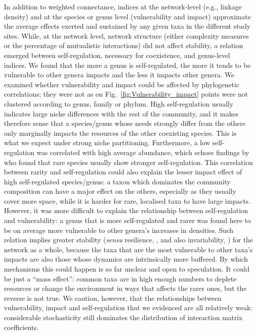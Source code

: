\documentclass[10pt]{article}
\begin{document}
In addition to weighted connectance, indices at the network-level
(e.g., linkage density) and at the species or genus level (vulnerability
and impact) approximate the average effects exerted and sustained
by any given taxa in the different study sites. While, at the network
level, network structure (either complexity measures or the percentage
of mutualistic interactions) did not affect stability, a relation
emerged between self-regulation, necessary for coexistence, and genus-level
indices. We found that the more a genus is self-regulated, the more
it tends to be vulnerable to other genera impacts and the less it
impacts other genera. We examined whether vulnerability and impact
could be affected by phylogenetic correlations; they were not as on
Fig.~\ref{fig:Vulnerability_impact} points were not clustered according
to genus, family or phylum. High self-regulation usually indicates
large niche differences with the rest of the community, and it makes
therefore sense that a species/genus whose needs strongly differ from
the others only marginally impacts the resources of the other coexisting
species. This is what we expect under strong niche partitioning. Furthermore,
a low self-regulation was correlated with high average abundance,
which echoes findings by \citet{yenni_persistent_2017} who found
that rare species usually show stronger self-regulation. This correlation
between rarity and self-regulation could also explain the lesser impact
effect of high self-regulated species/genus: a taxon which dominates
the community composition can have a major effect on the others, especially
as they usually cover more space, while it is harder for rare, localised
taxa to have large impacts. However, it was more difficult to explain
the relationship between self-regulation and vulnerability: a genus
that is more self-regulated and rarer was found here to be on average
more vulnerable to other genera's increases in densities. Such relation
implies greater stability (\emph{sensu} resilience, \citealt{ives_estimating_2003},
and also invariability, \citealt{Arnoldi431296}) for the network
as a whole, because the taxa that are the most vulnerable to other
taxa's impacts are also those whose dynamics are intrinsically more
buffered. By which mechanisms this could happen is so far unclear
and open to speculation. It could be just a ``mass effect'': common
taxa are in high enough numbers to deplete resources or change the
environment in ways that affects the rarer ones, but the reverse is
not true. We caution, however, that the relationships between vulnerability,
impact and self-regulation that we evidenced are all relatively weak:
considerable stochasticity still dominates the distribution of interaction
matrix coefficients.
\end{document}
